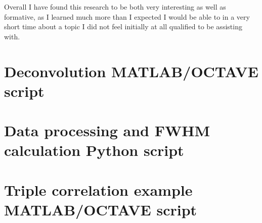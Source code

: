 \documentclass[a4paper]{article}
\begin{document}
Overall I have found this research to be both very interesting as well as formative, as I learned much more than I expected I would be able to in a very short time about a topic I did not feel initially at all qualified to be assisting with.

\printbibliography

\newpage
\begin{appendices}
\section{Deconvolution MATLAB/OCTAVE script}


\newpage
\section{Data processing and FWHM calculation Python script}


\newpage
\section{Triple correlation example MATLAB/OCTAVE script}

\end{appendices}
\end{document}
